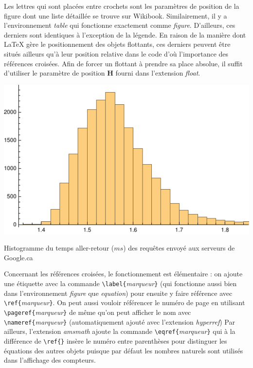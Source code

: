 %
\par Les lettres qui sont placées entre crochets sont les paramètres de position de la figure dont une liste détaillée se trouve sur Wikibook\footnotemark {}. Similairement, il y a l'environnement \textit{table} qui fonctionne exactement comme \textit{figure}. D'ailleurs, ces derniers sont identiques à l'exception de la légende. En raison de la manière dont \LaTeX{} gère le positionnement des objets flottants, ces derniers peuvent être situés ailleurs qu'à leur position relative dans le code d'où l'importance des références croisées. Afin de forcer un flottant à prendre sa place absolue, il suffit d'utiliser le paramètre de position \textbf{H} fourni dans l'extension \textit{float}.
%
\begin{table}[H]
	\centering
	\includegraphics[width=0.7\linewidth]{"PingHistogramTue 5 May 2020 084447"}
	\caption{Histogramme du temps aller-retour (\(ms\)) des requêtes envoyé aux serveurs de Google.ca}
	\label{fig:pinghistogramtue-5-may-2020-084447}
\end{table}
%
\par Concernant les références croisées, le fonctionnement est élémentaire : on ajoute une étiquette avec la commande \verb|\label{|\textit{marqueur}\verb|}| (qui fonctionne aussi bien dans l'environnement \textit{figure} que \textit{equation}) pour ensuite y faire référence avec \verb|\ref{|\textit{marqueur}\verb|}|. On peut aussi vouloir référencer le numéro de page en utilisant \verb|\pageref{|\textit{marqueur}\verb|}| de même qu'on peut afficher le nom avec \verb|\nameref{|\textit{marqueur}\verb|}| (automatiquement ajouté avec l'extension \textit{hyperref}) Par ailleurs, l'extension \textit{amsmath} ajoute la commande \verb|\eqref{|\textit{marqueur}\verb|}| qui à la différence de \verb|\ref{}| insère le numéro entre parenthèses pour distinguer les équations des autres objets puisque par défaut les nombres naturels sont utilisés dans l'affichage des compteurs.
